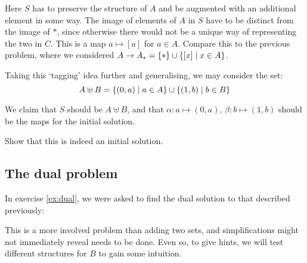 \begin{center}
\end{center}

Here $S$ has to preserve the structure of $A$ and be augmented with an
additional element in some way. The image of elements of $A$ in $S$ have to be
distinct from the image of $\ast$, since otherwise there would not be a unique
way of representing the two in $C$. This is a map $a \mapsto [a]$ for $a \in A$.
Compare this to the previous problem, where we considered
$A \to A_\ast = \{ \ast \} \cup \{ [x] \mid x \in A \}$.

Taking this `tagging' idea further and generalising, we may consider the set:
\begin{equation*}
A \uplus B = \{ (0, a) \mid a \in A \} \cup
\{ (1, b) \mid b \in B \}
\end{equation*}

We claim that $S$ should be $A \uplus B$, and that $\alpha: a \mapsto (0, a)$,
$\beta: b \mapsto (1, b)$ should be the maps for the initial solution.

\begin{exercise}
Show that this is indeed an initial solution.
\end{exercise}

\subsection{The dual problem}

In exercise \ref{ex:dual}, we were asked to find the dual solution to that
described previously:
\begin{center}
\end{center}

This is a more involved problem than adding two sets, and simplifications might
not immediately reveal needs to be done. Even so, to give hints, we will test
different structures for $B$ to gain some intuition.

